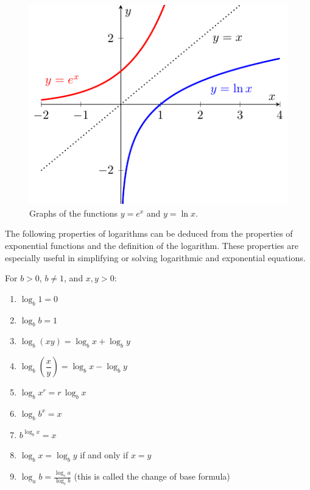 \begin{figure}[ht!]     
	\begin{center}         
        \includegraphics[width=0.5\columnwidth]{figures/0-4-fig1.pdf}
	\end{center}     
\caption{Graphs of the functions $y=e^{x}$ and $y=\ln{x}$.}     
\label{F:0.4.Ex1} 
\end{figure}

The following properties of logarithms can be deduced from the properties of exponential functions and the definition of the logarithm.  These properties are especially useful in simplifying or solving logarithmic and exponential equations.

 For $b>0$, $b \ne 1$, and $x,y>0$:
\begin{enumerate}
\item $\log_{b}1=0$
\item $\log_{b}b=1$
\item $\log_{b}\left(xy\right)=\log_{b}x+\log_{b}y$
\item $\log_{b}\left(\dfrac{x}{y}\right)=\log_{b}x-\log_{b}y$
\item $\log_{b}x^{r}=r\,\log_{b}x$
\item $\log_{b}b^{x}=x$
\item $b^{\log_{b}x}=x$
\item $\log_{b}x=\log_{b}y$ if and only if $x=y$
\item $\log_a b = \frac{\log_c a}{\log_c b}$ (this is called the change of base formula)
\end{enumerate}

